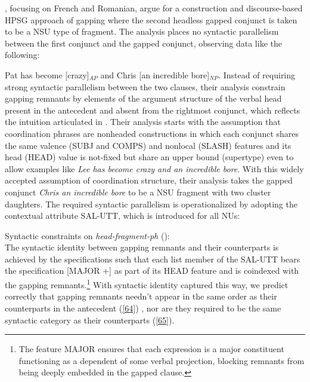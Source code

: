 \documentclass[output=paper
                ,modfonts
                ,nonflat
	        ,collection
	        ,collectionchapter
	        ,collectiontoclongg
 	        ,biblatex
                ,babelshorthands
                ,newtxmath
                ,draftmode
                ,colorlinks, citecolor=brown
]{./langsci/langscibook}
\begin{document}
\citet{Abeille2014}, focusing on French and Romanian, argue for a construction and
discourse-based HPSG approach of gapping where the second headless gapped conjunct is taken to be a
NSU type of fragment. The analysis places no syntactic parallelism between the 
first conjunct and the gapped conjunct, observing data like the following:

\ea Pat has become [crazy]$_{AP}$ and Chris [an incredible bore]$_{NP}$.  \label{65}\z
%
Instead of requiring strong syntactic parallelism between the two clauses, their analysis constrain gapping remnants by elements of the argument structure of the verbal head present in the antecedent and absent from the rightmost conjunct, which reflects the intuition articulated in \citet{Hankamer1971}. Their analysis starts with the assumption that coordination phrases are nonheaded constructions in which each conjunct shares the same
valence (SUBJ and COMPS) and nonlocal (SLASH) features and 
 its head (HEAD) value is not-fixed but share an upper bound (supertype) even to allow
 examples like {\it Lee has become crazy and an incredible bore}. With this 
 widely accepted assumption of coordination structure, their analysis
  takes the gapped conjunct {\it Chris an incredible
  bore} to be a NSU fragment with two cluster  daughters. The required
 syntactic parallelism is operationalized by adopting the contextual attribute SAL-UTT, which is introduced for all NUs:
 
 \ea
\label{gap-hf-con}
Syntactic constraints on {\it head-fragment-ph} (\citealt[(53)]{Abeille2014}):\\
 \impl
{}
\z
The syntactic identity between gapping remnants and their counterparts is achieved
by the specifications such that each list member of the SAL-UTT bears the specification [MAJOR +] as part of its HEAD feature and is coindexed with the gapping remnants.\footnote{The feature MAJOR ensures that each expression is a major
constituent functioning as a dependent of some verbal projection, blocking 
remnants from being deeply embedded in the gapped clause.}
   With syntactic identity captured this way, we predict correctly that gapping remnants needn't appear in the same order as their counterparts in the antecedent (\ref{64}) \citep[see][156--158]{Sag1985}, nor are they required to be the same syntactic category as their counterparts (\ref{65}).
    
\end{document}
